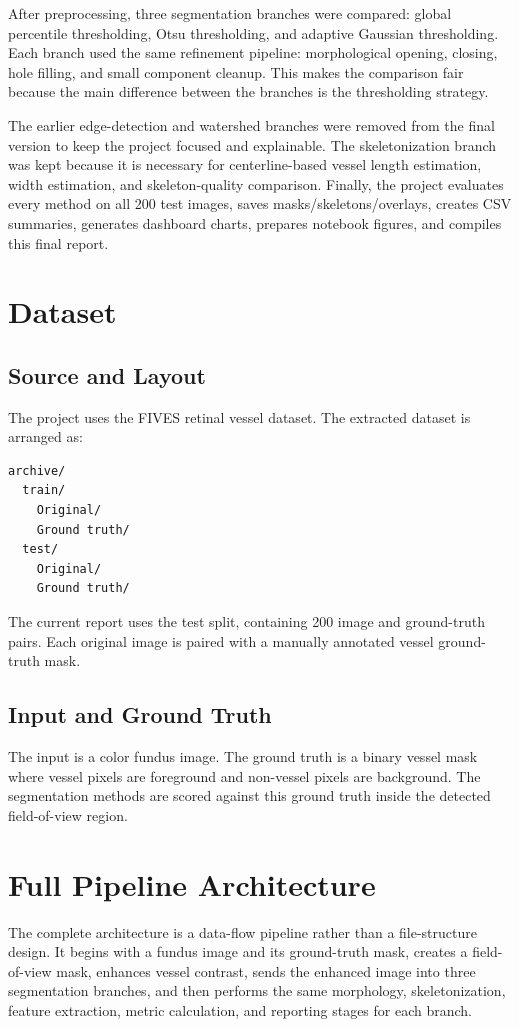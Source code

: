 \documentclass[12pt,a4paper]{article}
\begin{document}
After preprocessing, three segmentation branches were compared: global percentile thresholding, Otsu thresholding, and adaptive Gaussian thresholding. Each branch used the same refinement pipeline: morphological opening, closing, hole filling, and small component cleanup. This makes the comparison fair because the main difference between the branches is the thresholding strategy.

The earlier edge-detection and watershed branches were removed from the final version to keep the project focused and explainable. The skeletonization branch was kept because it is necessary for centerline-based vessel length estimation, width estimation, and skeleton-quality comparison. Finally, the project evaluates every method on all 200 test images, saves masks/skeletons/overlays, creates CSV summaries, generates dashboard charts, prepares notebook figures, and compiles this final report.

\section{Dataset}
\subsection{Source and Layout}
The project uses the FIVES retinal vessel dataset. The extracted dataset is arranged as:

\begin{verbatim}
archive/
  train/
    Original/
    Ground truth/
  test/
    Original/
    Ground truth/
\end{verbatim}

The current report uses the test split, containing 200 image and ground-truth pairs. Each original image is paired with a manually annotated vessel ground-truth mask.

\subsection{Input and Ground Truth}
The input is a color fundus image. The ground truth is a binary vessel mask where vessel pixels are foreground and non-vessel pixels are background. The segmentation methods are scored against this ground truth inside the detected field-of-view region.

\section{Full Pipeline Architecture}
The complete architecture is a data-flow pipeline rather than a file-structure design. It begins with a fundus image and its ground-truth mask, creates a field-of-view mask, enhances vessel contrast, sends the enhanced image into three segmentation branches, and then performs the same morphology, skeletonization, feature extraction, metric calculation, and reporting stages for each branch.
\end{document}
